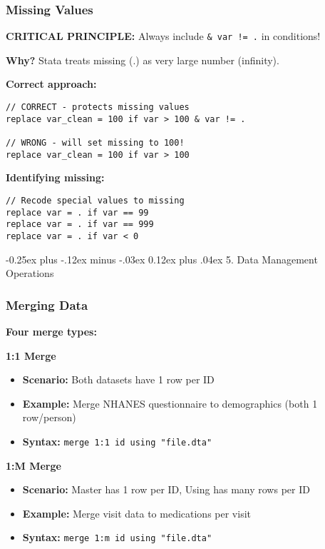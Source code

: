﻿\documentclass[8pt,letterpaper]{article}
\makeatletter
\renewcommand{\subsection}{\@startsection{subsection}{2}{0mm}%
                                {-0.25ex plus -.12ex minus -.03ex}%
                                {0.12ex plus .04ex}%
                                {\normalfont\fontsize{8pt}{8pt}\selectfont\bfseries\color{myblue}}}
\makeatother
\begin{document}
\begin{multicols}{2}
\subsubsection{Missing Values}

\textbf{CRITICAL PRINCIPLE:} Always include \texttt{\& var != .} in conditions!

\textbf{Why?} Stata treats missing (.) as very large number (infinity).

\textbf{Correct approach:}
\begin{lstlisting}
// CORRECT - protects missing values
replace var_clean = 100 if var > 100 & var != .

// WRONG - will set missing to 100!
replace var_clean = 100 if var > 100
\end{lstlisting}

\textbf{Identifying missing:}
\begin{lstlisting}
// Recode special values to missing
replace var = . if var == 99
replace var = . if var == 999
replace var = . if var < 0
\end{lstlisting}

\subsection{5. Data Management Operations}

\subsubsection{Merging Data}

\textbf{Four merge types:}

\textbf{1:1 Merge}
\begin{itemize}
\item \textbf{Scenario:} Both datasets have 1 row per ID
\item \textbf{Example:} Merge NHANES questionnaire to demographics (both 1 row/person)
\item \textbf{Syntax:} \texttt{merge 1:1 id using "file.dta"}
\end{itemize}

\textbf{1:M Merge}
\begin{itemize}
\item \textbf{Scenario:} Master has 1 row per ID, Using has many rows per ID
\item \textbf{Example:} Merge visit data to medications per visit
\item \textbf{Syntax:} \texttt{merge 1:m id using "file.dta"}
\end{itemize}


\end{multicols}
\end{document}
